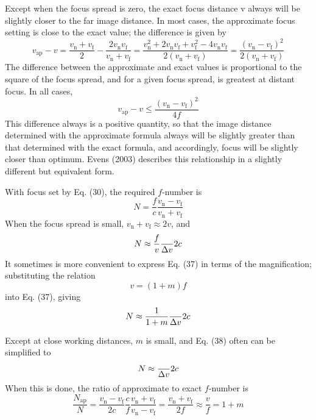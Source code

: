 \documentclass[11pt, oneside]{scrartcl}   	%
\newcommand{\Dv}{\ensuremath{\Delta v}}
\begin{document}
Except when the focus spread is zero, the exact focus distance v always will be slightly closer to the far image distance. In most cases, the approximate focus setting is close to the exact value; the difference is given by
\begin{equation}
v_\mathrm{ap} - v =  \frac{v_\mathrm{n}+v_\mathrm{f}}2 - \frac{2v_\mathrm{n}v_\mathrm{f}}{v_\mathrm{n} + v_\mathrm{f}} = \frac{v_\mathrm{n}^2+2v_\mathrm{n}v_\mathrm{f}+v_\mathrm{f}^2-4v_\mathrm{n}v_\mathrm{f}}{2(v_\mathrm{n}+v_\mathrm{f})} = \frac{(v_\mathrm{n} - v_\mathrm{f})^2}{2(v_\mathrm{n}+v_\mathrm{f})} 
   \label{eq:35}
\end{equation}
The difference between the approximate and exact values is proportional to the square of the focus spread, and for a given focus spread, is greatest at distant focus. In all cases,
\begin{equation}
v_\mathrm{ap} - v \leq \frac{(v_\mathrm{n} - v_\mathrm{f})^2}{4f} 
\end{equation}
This difference always is a positive quantity, so that the image distance determined with the approximate formula always will be slightly greater than that determined with the exact formula, and accordingly, focus will be slightly closer than optimum. Evens (2003) describes this relationship in a slightly different but equivalent form.

With focus set by Eq. (30), the required $f$-number is
\begin{equation}
    N = \frac f c\frac{v_\mathrm{n}-v_\mathrm{f}}{v_\mathrm{n}+v_\mathrm{f}}
    \label{eq:36}
\end{equation}
When the focus spread is small, $v_\mathrm{n} + v_\mathrm{f} \approx 2v$, and
\begin{equation}
   N \approx \frac f v \frac\Dv{2c}
   \label{eq:37}
\end{equation}
It sometimes is more convenient to express Eq. (37) in terms of the magnification; substituting the relation
\begin{equation}
   v=(1+m)f
\end{equation}
into Eq. (37), giving
\begin{equation}
   N\approx\frac1{1+m}\frac\Dv{2c}
   \label{eq:38}
\end{equation}

Except at close working distances, $m$ is small, and Eq. (38) often can be simplified to 
\begin{equation}
N\approx\frac\Dv{2c}
   \label{eq:39}
\end{equation}
When this is done, the ratio of approximate to exact $f$-number is
\begin{equation}
    \frac{N_\mathrm{ap}}N = \frac{v_\mathrm{n}-v_\mathrm{f}}{2c}\frac c f\frac{v_\mathrm{n}+v_\mathrm{f}}{v_\mathrm{n}-v_\mathrm{f}} = \frac{v_\mathrm{n}+v_\mathrm{f}}{2f}\approx\frac v f = 1+m
    \label{eq:40}
\end{equation}
\end{document}
